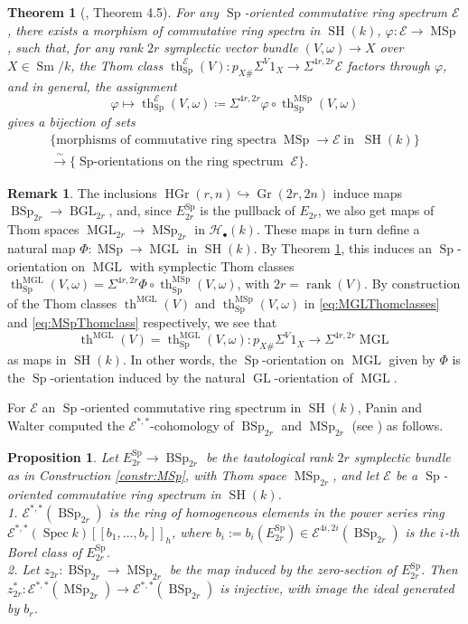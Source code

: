\documentclass[10pt]{amsart}
\theoremstyle{definition}
\newtheorem{rmk}[defn]{Remark}
\theoremstyle{plain}
\newtheorem{thm}[defn]{Theorem}
\newtheorem{prop}[defn]{Proposition}
\numberwithin{equation}{section}
\newcommand{\0}{\emptyset}
\newcommand{\sE}{{\mathcal E}}
\newcommand{\sH}{{\mathcal H}}
\newcommand{\MGL}{{\operatorname{MGL}}}
\newcommand{\MSp}{{\operatorname{MSp}}}
\newcommand{\BGL}{{\operatorname{BGL}}}
\newcommand{\BSp}{{\operatorname{BSp}}}
\newcommand{\GL}{{\operatorname{GL}}}
\newcommand{\Sp}{{\operatorname{Sp}}}
\newcommand{\Gr}{{\operatorname{Gr}}}
\newcommand{\HGr}{{\operatorname{HGr}}}
\newcommand{\Spec}{{\operatorname{Spec}}}
\newcommand{\SH}{{\operatorname{SH}}}
\newcommand{\Sm}{{\operatorname{Sm}}}
\renewcommand{\th}{{\operatorname{th}}}
\newcommand{\rnk}{{\operatorname{rank}}}
\begin{document}
\begin{thm}[\cite{PanWal:MSpKtheory}, Theorem 4.5]
\label{thm:universalitySp}
    For any $\Sp$-oriented commutative ring spectrum $\sE$, there exists a morphism of commutative ring spectra in $\SH(k)$, $\varphi:\sE \to \MSp$, such that, for any rank $2r$ symplectic vector bundle $(V,\omega)\to X$ over $X \in \Sm/k$, the Thom class $\th_\Sp^\sE(V):p_{X\#}\Sigma^V1_X \to \Sigma^{4r,2r}\sE$ factors through $\varphi$,
    and in general, the assignment
    $$\varphi \mapsto \th_\Sp^\sE(V,\omega)\coloneqq \Sigma^{4r,2r}\varphi \circ \th_\Sp^\MSp(V,\omega)$$
    gives a bijection of sets
    \begin{multline*}
        \{\text{morphisms of commutative ring spectra} \;  \MSp \to \sE \; \text{in} \; \; \SH(k)\} \\ \xrightarrow{\sim} \{\text{$\Sp$-orientations on the ring spectrum} \; \sE\}.
    \end{multline*}
\end{thm}

\begin{rmk}
\label{rmk:MSp-MGLThomClasses}
    The inclusions $\HGr(r,n) \hookrightarrow \Gr(2r,2n)$ induce maps $\BSp_{2r} \to \BGL_{2r}$, and, since $E_{2r}^\Sp$ is the pullback of $E_{2r}$, we also get maps of Thom spaces $\MGL_{2r} \to \MSp_{2r}$ in $\sH_{\bullet}(k)$. These maps in turn define a natural map $\Phi:\MSp \to \MGL$ in $\SH(k)$. By Theorem \ref{thm:universalitySp}, this induces an $\Sp$-orientation on $\MGL$ with symplectic Thom classes $\th_\Sp^\MGL(V,\omega)=\Sigma^{4r,2r} \Phi \circ \th_\Sp^\MSp(V,\omega)$, with $2r= \rnk(V)$. By construction of the Thom classes $\th^\MGL(V)$ and $\th_\Sp^\MSp(V,\omega)$ in \eqref{eq:MGLThomclasses} and \eqref{eq:MSpThomclass} respectively, we see that
    $$\th^\MGL(V) = \th_\Sp^\MGL(V,\omega): p_{X \#}\Sigma^V 1_X \to \Sigma^{4r,2r}\MGL$$
    as maps in $\SH(k)$. In other words, the $\Sp$-orientation on $\MGL$ given by $\Phi$ is the $\Sp$-orientation induced by the natural $\GL$-orientation of $\MGL$.
\end{rmk}

For $\sE$ an $\Sp$-oriented commutative ring spectrum in $\SH(k)$, Panin and Walter computed the $\sE^{*,*}$-cohomology of $\BSp_{2r}$ and $\MSp_{2r}$ (see \cite[Section 9]{Panwal-cobordism}) as follows.

\begin{prop} \label{prop:CohBSpMSp} Let $E^\Sp_{2r}\to \BSp_{2r}$ be the tautological rank $2r$ symplectic bundle as in Construction \ref{constr:MSp}, with Thom space $\MSp_{2r}$, and let  $\sE$ be a $\Sp$-oriented commutative ring spectrum in $\SH(k)$.\\[5pt]
1. $\sE^{*,*}(\BSp_{2r})$ is the ring of homogeneous elements in the power series ring $\sE^{*,*}(\Spec k)[[b_1,\ldots, b_r]]_h$, where $b_i:=b_i(E^\Sp_{2r})\in \sE^{4i,2i}(\BSp_{2r})$ is the $i$-th Borel class of $E^\Sp_{2r}$.\\[2pt]

2. Let $z_{2r}:\BSp_{2r}\to \MSp_{2r}$ be the map induced by the zero-section of $E^\Sp_{2r}$. Then $z_{2r}^*:\sE^{*,*}(\MSp_{2r})\to \sE^{*,*}(\BSp_{2r})$ is injective, with image the ideal generated by $b_r$.
\end{prop}
\end{document}
